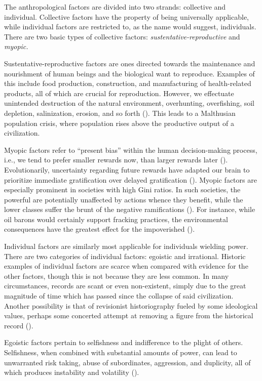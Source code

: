 \documentclass[12pt, a4paper, twoside]{article}
\begin{document}
The anthropological factors are divided into two strands: collective and individual. Collective factors have the property of being universally applicable, while individual factors are restricted to, as the name would suggest, individuals. There are two basic types of collective factors: \emph{sustentative-reproductive} and \emph{myopic.}

Sustentative-reproductive factors are ones directed towards the maintenance and nourishment of human beings and the biological want to reproduce. Examples of this include food production, construction, and manufacturing of health-related products, all of which are crucial for reproduction. However, we effectuate unintended destruction of the natural environment, overhunting, overfishing, soil depletion, salinization, erosion, and so forth (\cite{diamond2017youtube}). This leads to a Malthusian population crisis, where population rises above the productive output of a civilization. 

Myopic factors refer to “present bias” within the human decision-making process, i.e., we tend to prefer smaller rewards now, than larger rewards later (\cite[p.\ 1]{chakraborty2021present}). Evolutionarily, uncertainty regarding future rewards have adapted our brain to prioritize immediate gratification over delayed gratification (\cite[p.\ 1]{albrecht2013what}). Myopic factors are especially prominent in societies with high Gini ratios. In such societies, the powerful are potentially unaffected by actions whence they benefit, while the lower classes suffer the brunt of the negative ramifications (\cite{paulson2015shorttermism}). For instance, while oil barons would certainly support fracking practices, the environmental consequences have the greatest effect for the impoverished (\cite{lin2022fracking}).

Individual factors are similarly most applicable for individuals wielding power. There are two categories of individual factors: egoistic and irrational. Historic examples of individual factors are scarce when compared with evidence for the other factors, though this is not because they are less common. In many circumstances, records are scant or even non-existent, simply due to the great magnitude of time which has passed since the collapse of said civilization. Another possibility is that of revisionist historiography fueled by some ideological values, perhaps some concerted attempt at removing a figure from the historical record (\cite{burton2020akhenaten}). 

Egoistic factors pertain to selfishness and indifference to the plight of others. Selfishness, when combined with substantial amounts of power, can lead to unwarranted risk taking, abuse of subordinates, aggression, and duplicity, all of which produces instability and volatility (\cites{simmons2024narcissistic}[pp.\ 9–10]{blanton2020moral}). 
\end{document}
